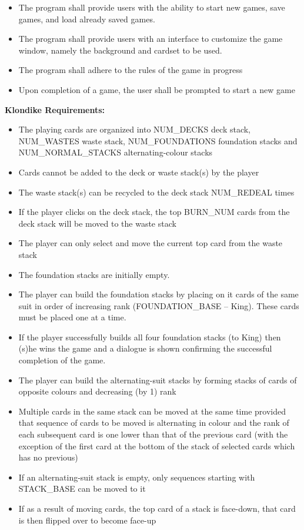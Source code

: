 \documentclass[12pt, titlepage]{article}
\begin{document}
		\vspace{-2mm}
		\begin{itemize}
			\itemsep0em
			\item The program shall provide users with the ability to start new 
			games, save games, and load already saved games.
			\item The program shall provide users with an interface to 
			customize the game window, namely the background and cardset to be 
			used.
			\item The program shall adhere to the rules of the game in progress
			\item Upon completion of a game, the user shall be prompted to 
			start a new game
		\end{itemize}
		\indent \textbf{Klondike Requirements:} \label{Kreq}
		\vspace{-2mm}
		\begin{itemize}
			\itemsep0em
			\item The playing cards are organized into NUM\_DECKS deck stack, 
			NUM\_WASTES waste stack, NUM\_FOUNDATIONS foundation stacks and 
			NUM\_NORMAL\_STACKS alternating-colour stacks
			\item Cards cannot be added to the deck or waste stack(s) by the 
			player
			\item The waste stack(s) can be recycled to the deck stack 
			NUM\_REDEAL times
			\item If the player clicks on the deck stack, the top BURN\_NUM 
			cards from the deck stack will be moved to the waste stack
			\item The player can only select and move the current top card from 
			the waste stack
			\item The foundation stacks are initially empty.
			\item The player can build the foundation stacks by placing on it 
			cards of the same suit in order of increasing rank 
			(FOUNDATION\_BASE – King). These cards must be placed one at a time.
			\item If the player successfully builds all four foundation stacks 
			(to King) then (s)he wins the game and a dialogue is shown 
			confirming the successful completion of the game.
			\item The player can build the alternating-suit stacks by forming 
			stacks of cards of opposite colours and decreasing (by 1) rank
			\item Multiple cards in the same stack can be moved at the same 
			time provided that sequence of cards to be moved is alternating in 
			colour and the rank of each subsequent card is one lower than that 
			of the previous card (with the exception of the first card at the 
			bottom of the stack of selected cards which has no previous)
			\item If an alternating-suit stack is empty, only sequences 
			starting with STACK\_BASE can be moved to it
			\item If as a result of moving cards, the top card of a stack is 
			face-down, that card is then flipped over to become face-up
		\end{itemize}
	
\end{document}
